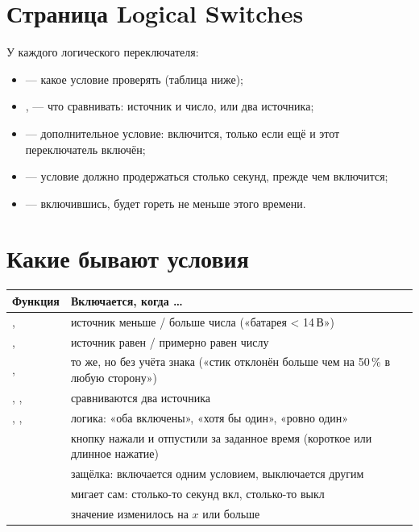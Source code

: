 \section{Страница Logical Switches}

\begin{center}
\end{center}

У каждого логического переключателя:
\begin{itemize}
  \item {} --- какое условие проверять (таблица ниже);
  \item {},  --- что сравнивать: источник и число, или два источника;
  \item {} --- дополнительное условие:  включится, только если ещё
        и этот переключатель включён;
  \item {} --- условие должно продержаться столько секунд, прежде чем  включится;
  \item {} --- включившись,  будет гореть не меньше этого времени.
\end{itemize}

\section{Какие бывают условия}

\begin{center}\small
\renewcommand{\arraystretch}{1.2}
\begin{tabularx}{\linewidth}{@{}L{28mm}Y@{}}
\toprule
\textbf{Функция} & \textbf{Включается, когда …} \\
\midrule
{},  & источник меньше / больше числа («батарея < 14\,В») \\
,  & источник равен / примерно равен числу \\
,  & то же, но без учёта знака («стик отклонён больше чем на 50\,\% в любую сторону») \\
, ,  & сравниваются два источника \\
, ,  & логика: «оба включены», «хотя бы один», «ровно один» \\
 & кнопку нажали и отпустили за заданное время (короткое или длинное нажатие) \\
 & защёлка: включается одним условием, выключается другим \\
 & мигает сам: столько-то секунд вкл, столько-то выкл \\
 & значение изменилось на $x$ или больше \\
\bottomrule
\end{tabularx}
\end{center}

